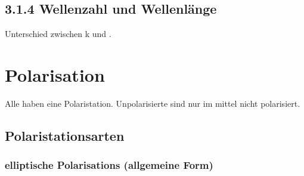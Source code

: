 \documentclass[a4paper]{article}
\begin{document}
\subsection*{3.1.4 Wellenzahl und Wellenlänge}
Unterschied zwischen k und \omega.
\section*{Polarisation}
Alle haben eine Polaristation. Unpolarisierte sind nur im mittel nicht polarisiert.
\subsection*{Polaristationsarten}
\subsubsection*{elliptische Polarisations (allgemeine Form)}
\end{document}
